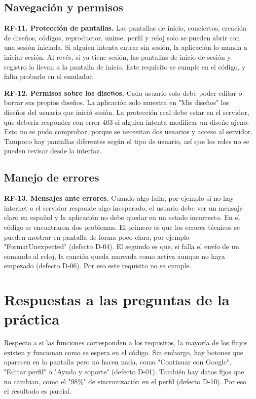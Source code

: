 \documentclass[11pt,a4paper]{article}
\begin{document}
\subsection*{Navegación y permisos}

\textbf{RF-11. Protección de pantallas.} Las pantallas de inicio, conciertos, creación de diseños, códigos, reproductor, unirse, perfil y reloj solo se pueden abrir con una sesión iniciada. Si alguien intenta entrar sin sesión, la aplicación lo manda a iniciar sesión. Al revés, si ya tiene sesión, las pantallas de inicio de sesión y registro lo llevan a la pantalla de inicio. Este requisito se cumple en el código, y falta probarlo en el emulador.

\textbf{RF-12. Permisos sobre los diseños.} Cada usuario solo debe poder editar o borrar sus propios diseños. La aplicación solo muestra en "Mis diseños" los diseños del usuario que inició sesión. La protección real debe estar en el servidor, que debería responder con error 403 si alguien intenta modificar un diseño ajeno. Esto no se pudo comprobar, porque se necesitan dos usuarios y acceso al servidor. Tampoco hay pantallas diferentes según el tipo de usuario, así que los roles no se pueden revisar desde la interfaz.

\subsection*{Manejo de errores}

\textbf{RF-13. Mensajes ante errores.} Cuando algo falla, por ejemplo si no hay internet o el servidor responde algo inesperado, el usuario debe ver un mensaje claro en español y la aplicación no debe quedar en un estado incorrecto. En el código se encontraron dos problemas. El primero es que los errores técnicos se pueden mostrar en pantalla de forma poco clara, por ejemplo "FormatUnexpected" (defecto D-04). El segundo es que, si falla el envío de un comando al reloj, la canción queda marcada como activa aunque no haya empezado (defecto D-06). Por eso este requisito no se cumple.

\section*{Respuestas a las preguntas de la práctica}

Respecto a si las funciones corresponden a los requisitos, la mayoría de los flujos existen y funcionan como se espera en el código. Sin embargo, hay botones que aparecen en la pantalla pero no hacen nada, como "Continuar con Google", "Editar perfil" o "Ayuda y soporte" (defecto D-01). También hay datos fijos que no cambian, como el "98\%" de sincronización en el perfil (defecto D-10). Por eso el resultado es parcial.
\end{document}
